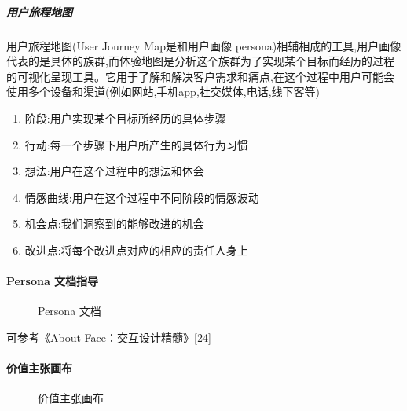 \documentclass[letterpaper,10pt,english]{sphinxmanual}
\begin{document}
\subparagraph{用户旅程地图}
\label{\detokenize{chapter_knowledge/users_analysis:id18}}
用户旅程地图(User Journey Map是和用户画像
persona)相辅相成的工具,用户画像代表的是具体的族群,而体验地图是分析这个族群为了实现某个目标而经历的过程的可视化呈现工具。它用于了解和解决客户需求和痛点,在这个过程中用户可能会使用多个设备和渠道(例如网站,手机app,社交媒体,电话,线下客等)
\begin{enumerate}
%
\item {} 
阶段:用户实现某个目标所经历的具体步骤

\item {} 
行动:每一个步骤下用户所产生的具体行为习惯

\item {} 
想法:用户在这个过程中的想法和体会

\item {} 
情感曲线:用户在这个过程中不同阶段的情感波动

\item {} 
机会点:我们洞察到的能够改进的机会

\item {} 
改进点:将每个改进点对应的相应的责任人身上

\end{enumerate}


\paragraph{Persona 文档指导}
\label{\detokenize{chapter_knowledge/users_analysis:persona}}
\begin{figure}[H]
\centering
\capstart

\noindent{}
\caption{Persona 文档}\label{\detokenize{chapter_knowledge/users_analysis:id41}}\end{figure}

可参考《About Face：交互设计精髓》{[}24{]}


\paragraph{价值主张画布}
\label{\detokenize{chapter_knowledge/users_analysis:id19}}
\begin{figure}[H]
\centering
\capstart

\noindent{}
\caption{价值主张画布}\label{\detokenize{chapter_knowledge/users_analysis:id42}}\end{figure}
\end{document}
